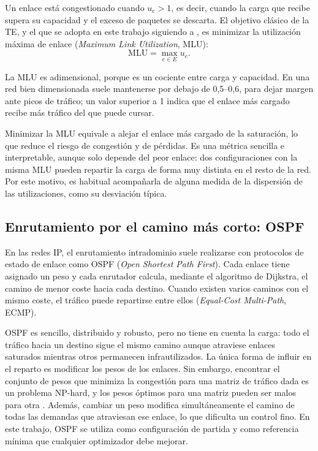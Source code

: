 Un enlace está congestionado cuando $u_e > 1$, es decir, cuando la carga que recibe supera su capacidad y el exceso de paquetes se descarta. El objetivo clásico de la TE, y el que se adopta en este trabajo siguiendo a \cite{ALMASAN2022109166}, es minimizar la utilización máxima de enlace (\textit{Maximum Link Utilization}, MLU):
\begin{equation}\label{eq:mlu}
	\mathrm{MLU} = \max_{e \in E} u_e .
\end{equation}

La MLU es adimensional, porque es un cociente entre carga y capacidad. En una red bien dimensionada suele mantenerse por debajo de 0,5--0,6, para dejar margen ante picos de tráfico; un valor superior a 1 indica que el enlace más cargado recibe más tráfico del que puede cursar.

Minimizar la MLU equivale a alejar el enlace más cargado de la saturación, lo que reduce el riesgo de congestión y de pérdidas. Es una métrica sencilla e interpretable, aunque solo depende del peor enlace: dos configuraciones con la misma MLU pueden repartir la carga de forma muy distinta en el resto de la red. Por este motivo, es habitual acompañarla de alguna medida de la dispersión de las utilizaciones, como su desviación típica.

\subsection{Enrutamiento por el camino más corto: OSPF}\label{sec:ospf}

En las redes IP, el enrutamiento intradominio suele realizarse con protocolos de estado de enlace como OSPF (\textit{Open Shortest Path First}). Cada enlace tiene asignado un peso y cada enrutador calcula, mediante el algoritmo de Dijkstra, el camino de menor coste hacia cada destino. Cuando existen varios caminos con el mismo coste, el tráfico puede repartirse entre ellos (\textit{Equal-Cost Multi-Path}, ECMP).

OSPF es sencillo, distribuido y robusto, pero no tiene en cuenta la carga: todo el tráfico hacia un destino sigue el mismo camino aunque atraviese enlaces saturados mientras otros permanecen infrautilizados. La única forma de influir en el reparto es modificar los pesos de los enlaces. Sin embargo, encontrar el conjunto de pesos que minimiza la congestión para una matriz de tráfico dada es un problema NP-hard, y los pesos óptimos para una matriz pueden ser malos para otra \cite{fortz2000internet}. Además, cambiar un peso modifica simultáneamente el camino de todas las demandas que atraviesan ese enlace, lo que dificulta un control fino. En este trabajo, OSPF se utiliza como configuración de partida y como referencia mínima que cualquier optimizador debe mejorar.

